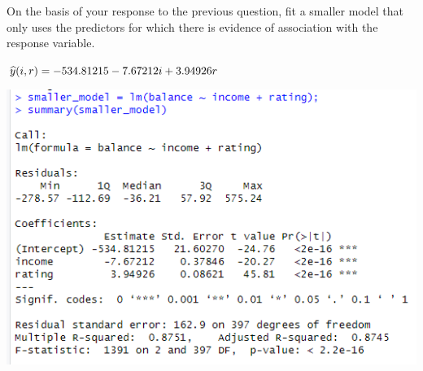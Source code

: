 On the basis of your response to the previous question, fit a smaller model that only
uses the predictors for which there is evidence of association with the response variable.

\soln* $\widehat{y}(i,r) = -534.81215 - 7.67212i + 3.94926 r $
\begin{center}
    \includegraphics[width=6in]{img/ex2g.PNG}
\end{center}